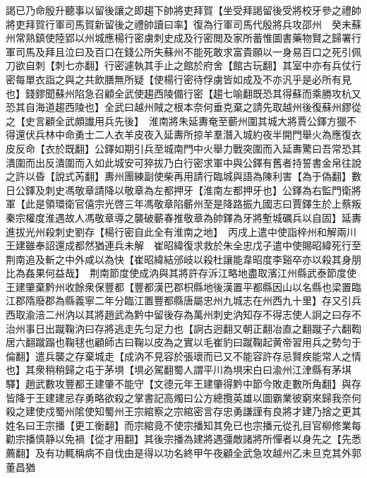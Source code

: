 謁已乃命殷升聽事以留後讓之即趨下帥將吏拜賀【坐受拜謁留後受將校牙參之禮帥將吏拜賀行軍司馬賀新留後之禮帥讀曰率】復為行軍司馬代殷將兵攻邵州　癸未蘇州常熟鎮使陸郢以州城應楊行密虜刺史成及行密閲及家所蓄惟圖書藥物賢之歸署行軍司馬及拜且泣曰及百口在錢公所失蘇州不能死敢求富貴願以一身易百口之死引佩刀欲自刺【刺七亦翻】行密遽執其手止之館於府舍【館古玩翻】其室中亦有兵仗行密每單衣詣之與之共飲膳無所疑【使楊行密待俘虜皆如成及不亦汎乎是必所有見也】錢鏐聞蘇州陷急召顧全武使趨西陵備行密【趨七喻翻既恐其得蘇而乘勝攻杭又恐其自海道趨西陵也】全武曰越州賊之根本奈何垂克棄之請先取越州後復蘇州鏐從之【史言顧全武頗䜟用兵先後】　淮南將朱延夀奄至蘄州圍其城大將賈公鐸方獵不得還伏兵林中命勇士二人衣羊皮夜入延夀所掠羊羣潛入城約夜半開門舉火為應復衣皮反命【衣於既翻】公鐸如期引兵至城南門中火舉力戰突圍而入延夀驚曰吾常恐其潰圍而出反潰圍而入如此城安可猝拔乃白行密求軍中與公鐸有舊者持誓書金帛往說之許以昏【說式芮翻】夀州團練副使柴再用請行臨城與語為陳利害【為于偽翻】數日公鐸及刺史馮敬章請降以敬章為左都押牙【淮南左都押牙也】公鐸為右監門衛將軍【此是領環衛官僖宗光啓三年馮敬章陷蘄州至是降路振九國志曰賈鐸生於上蔡叛秦宗權度淮遇故人馮敬章導之襲破蘄春推敬章為帥鐸為牙將塹城礪兵以自固】延夀進拔光州殺刺史劉存【楊行密自此全有淮南之地】　丙戌上遣中使詣梓州和解兩川王建雖奉詔還成都然猶連兵未解　崔昭緯復求救於朱全忠戊子遣中使賜昭緯死行至荆南追及斬之中外咸以為快【崔昭緯結邠岐以殺杜讓能韋昭度李谿卒亦以殺其身朋比為姦果何益哉】　荆南節度使成汭與其將許存泝江略地盡取濱江州縣武泰節度使王建肇棄黔州收餘衆保豐都【豐都漢巴郡枳縣地後漢置平都縣因山以名縣也梁置臨江郡隋廢郡為縣義寧二年分臨江置豐都縣唐屬忠州九城志在州西九十里】存又引兵西取渝涪二州汭以其將趙武為黔中留後存為萬州刺史汭知存不得志使人詗之曰存不治州事日出蹴鞠汭曰存將逃走先匀足力也【詗古迥翻又朝正翻冶直之翻蹴子六翻鞫居六翻蹴蹋也鞠毬也顧師古曰鞠以皮為之實以毛崔豹曰蹴鞠起黄帝習用兵之勢匀于倫翻】遣兵襲之存棄城走【成汭不見容於張瓌而已又不能容許存忌賢疾能常人之情也】其衆稍稍歸之屯于茅埧【埧必駕翻蜀人謂平川為埧宋白曰渝州江津縣有茅㙋驛】趙武數攻豐都王建肇不能守【文德元年王建肇得黔中節今敗走數所角翻】與存皆降于王建建忌存勇略欲殺之掌書記高燭曰公方總攬英雄以圖霸業彼窮來歸我奈何殺之建使戍蜀州隂使知蜀州王宗綰察之宗綰密言存忠勇謙謹有良將才建乃捨之更其姓名曰王宗播【更工衡翻】而宗綰竟不使宗播知其免已也宗播元從孔目官柳修業每勸宗播慎静以免禍【從才用翻】其後宗播為建將遇彊敵諸將所憚者以身先之【先悉薦翻】及有功輒稱病不自伐由是得以功名終甲午夜顧全武急攻越州乙未旦克其外郭董昌猶

